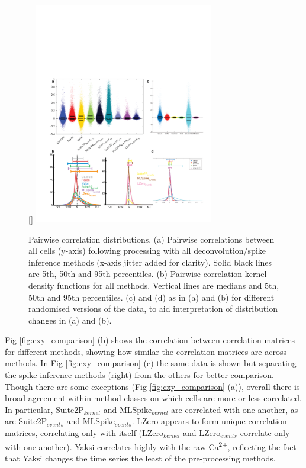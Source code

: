 \documentclass[a4paper,10pt,twocolumn]{article}
\begin{document}
\begin{figure}
[\FBwidth]
{\includegraphics[trim={23 23 10 120}, clip, width=0.7\textwidth]{full_figs/why_deconvolve_F9_2.png}}
{\caption{\label{fig:cxy_dist}Pairwise correlation distributions. (a) Pairwise correlations between all cells (y-axis) following processing with all deconvolution/spike inference methods (x-axis jitter added for clarity). Solid black lines are 5th, 50th and 95th percentiles. (b) Pairwise correlation kernel density functions for all methods.  Vertical lines are medians and 5th, 50th and 95th percentiles. (c) and (d) as in (a) and (b) for different randomised versions of the data, to aid interpretation of distribution changes in (a) and (b).}}
\end{figure}

Fig \ref{fig:cxy_comparison} (b) shows the correlation between correlation matrices for different methods, showing how similar the correlation matrices are across methods. In Fig \ref{fig:cxy_comparison} (c) the same data is shown but separating the spike inference methods (right) from the others for better comparison. Though there are some exceptions (Fig \ref{fig:cxy_comparison} (a)), overall there is broad agreement within method classes on which cells are more or less correlated. In particular, Suite2P$_{kernel}$ and MLSpike$_{kernel}$ are correlated with one another, as are Suite2P$_{events}$ and MLSpike$_{events}$. LZero appears to form unique correlation matrices, correlating only with itself (LZero$_{kernel}$ and LZero$_{events}$ correlate only with one another). Yaksi correlates highly with the raw Ca\textsuperscript{2+}, reflecting the fact that Yaksi changes the time series the least of the pre-processing methods. 
\end{document}
